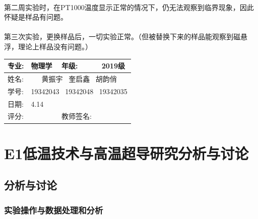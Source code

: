 \documentclass{ctexart}                                     %
\newcommand{\experimentname}{E1低温技术与高温超导研究}
\newcommand{\student}{黄振宇  \ 奎启鑫 \ 胡韵俏}
\newcommand{\Grade}{2019级}
\newcommand{\stuID}{19342043  \ 19342048 \ 19342035}
\newcommand{\reviewdate}{4.14}
\theoremstyle{ansstyle}
\newcommand{\reviewdata}{%
	\begin{center}
		\begin{tabular}{|p{2cm}|p{4cm}|p{4cm}|p{4cm}|}
			\hline
			专业: & 物理学 & 年级:  & \Grade \\
			\hline
			姓名:  & \multicolumn{3}{c|}{\student} \\
			\hline 
			学号:  & \multicolumn{3}{c|}{\stuID} \\
			\hline
			日期: & \reviewdate & & \\
			\hline
			评分: & & 教师签名: & \\
			\hline
		\end{tabular}
	\end{center}%
}
\begin{document}
\paragraph{}第二周实验时，在PT1000温度显示正常的情况下，仍无法观察到临界现象，因此怀疑是样品有问题。
\paragraph{}第三次实验，更换样品后，一切实验正常。（但被替换下来的样品能观察到磁悬浮，理论上样品没有问题。）

\newpage


\reviewdata

\section*{\experimentname 分析与讨论}


\subsection{分析与讨论}
\subsubsection{实验操作与数据处理和分析}
\end{document}
